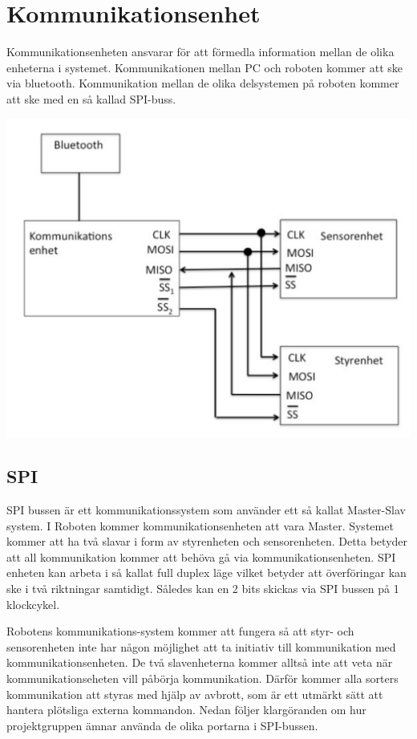 \section{Kommunikationsenhet}

Kommunikationsenheten ansvarar för att förmedla information mellan de olika enheterna i systemet. 
Kommunikationen mellan PC och roboten kommer att ske via bluetooth. Kommunikation mellan de olika delsystemen på roboten kommer att ske med en så kallad SPI-buss.

\includegraphics[angle=270,scale=0.5]{SPI-buss.pdf}


\subsection{SPI}
SPI bussen är ett kommunikationssystem som använder ett så kallat Master-Slav system. I Roboten kommer kommunikationsenheten att vara Master. Systemet kommer att ha två slavar i form av styrenheten och sensorenheten.
Detta betyder att all kommunikation kommer att behöva gå via kommunikationsenheten. SPI enheten kan arbeta i så kallat full duplex läge vilket betyder att överföringar kan ske i två riktningar samtidigt. Således kan en 2 bits skickas via SPI bussen på 1 klockcykel.

Robotens kommunikations-system kommer att fungera så att styr- och sensorenheten inte har någon möjlighet att ta initiativ till kommunikation med kommunikationsenheten. De två slavenheterna kommer alltså inte att veta när kommunikationseheten vill påbörja kommunikation. Därför kommer alla sorters kommunikation att styras med hjälp av avbrott, som är ett utmärkt sätt att hantera plötsliga externa kommandon. 
Nedan följer klargöranden om hur projektgruppen ämnar använda de olika portarna i SPI-bussen.

